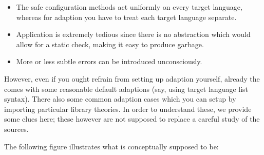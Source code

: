 \begin{isabellebody}
\begin{isamarkuptext}
  \begin{itemize}
    \item The safe configuration methods act uniformly on every target language,
      whereas for adaption you have to treat each target language separate.
    \item Application is extremely tedious since there is no abstraction
      which would allow for a static check, making it easy to produce garbage.
    \item More or less subtle errors can be introduced unconsciously.
  \end{itemize}

  \noindent However, even if you ought refrain from setting up adaption
  yourself, already the  comes with some reasonable default
  adaptions (say, using target language list syntax).  There also some
  common adaption cases which you can setup by importing particular
  library theories.  In order to understand these, we provide some clues here;
  these however are not supposed to replace a careful study of the sources.%
\end{isamarkuptext}%
\isamarkuptrue%
%
\isamarkuptrue%
%
\begin{isamarkuptext}%
The following figure illustrates what  is conceptually
  supposed to be:


\end{isamarkuptext}
\end{isabellebody}

